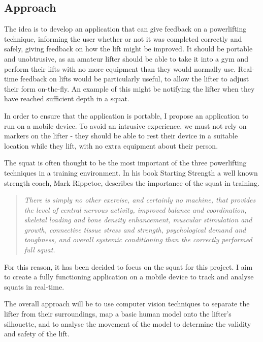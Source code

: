 \subsection{Approach}

The idea is to develop an application that can give feedback on a powerlifting technique, informing the user whether or not it was completed correctly and safely, giving feedback on how the lift might be improved. It should be portable and unobtrusive, as an amateur lifter should be able to take it into a gym and perform their lifts with no more equipment than they would normally use. Real-time feedback on lifts would be particularly useful, to allow the lifter to adjust their form on-the-fly. An example of this might be notifying the lifter when they have reached sufficient depth in a squat.

In order to ensure that the application is portable, I propose an application to run on a mobile device. To avoid an intrusive experience, we must not rely on markers on the lifter - they should be able to rest their device in a suitable location while they lift, with no extra equipment about their person.

The squat is often thought to be the most important of the three powerlifting techniques in a training environment. In his book Starting Strength\cite{startingstrength} a well known strength coach, Mark Rippetoe, describes the importance of the squat in training.

\begin{quote}
\emph{There is simply no other exercise, and certainly no machine, that provides the level of central nervous activity, improved balance and coordination, skeletal loading and bone density enhancement, muscular stimulation and growth, connective tissue stress and strength, psychological demand and toughness, and overall systemic conditioning than the correctly performed full squat.}
\end{quote}

For this reason, it has been decided to focus on the squat for this project. I aim to create a fully functioning application on a mobile device to track and analyse squats in real-time.

The overall approach will be to use computer vision techniques to separate the lifter from their surroundings, map a basic human model onto the lifter's silhouette, and to analyse the movement of the model to determine the validity and safety of the lift.
